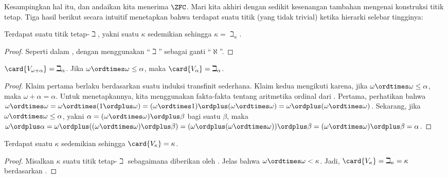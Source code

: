 \documentclass[../../../include/open-logic-section]{subfiles}
\begin{document}
Kesampingkan hal itu, dan andaikan kita menerima $\ZFC$. Mari kita akhiri
dengan sedikit kesenangan tambahan mengenai konstruksi titik tetap. Tiga
hasil berikut secara intuitif menetapkan bahwa terdapat suatu titik (yang
tidak trivial) ketika hierarki selebar tingginya:

\begin{prop}
Terdapat suatu titik tetap-$\beth$, yakni suatu $\kappa$ sedemikian sehingga
$\kappa=\beth_\kappa$.
\end{prop}

\begin{proof}
Seperti dalam , dengan menggunakan ``$\beth$'' sebagai
ganti ``$\aleph$''.
\end{proof}

\begin{prop}
$\card{V_{\omega+\alpha}} = \beth_{\alpha}$. Jika $\omega \ordtimes
\omega \leq \alpha$, maka $\card{V_\alpha} = \beth_\alpha$.
\end{prop}

\begin{proof}
Klaim pertama berlaku berdasarkan suatu induksi transfinit sederhana. Klaim
kedua mengikuti karena, jika $\omega \ordtimes \omega \leq \alpha$, maka
$\omega + \alpha = \alpha$. Untuk menetapkannya, kita menggunakan fakta-fakta
tentang aritmetika ordinal dari . Pertama,
perhatikan bahwa $\omega \ordtimes \omega = \omega \ordtimes (1 \ordplus
\omega) = (\omega \ordtimes 1) \ordplus (\omega\ordtimes\omega) = \omega
\ordplus (\omega \ordtimes \omega)$. Sekarang, jika $\omega \ordtimes \omega
\leq \alpha$, yakni $\alpha = (\omega\ordtimes\omega) \ordplus \beta$ bagi
suatu $\beta$, maka $\omega \ordplus \alpha = \omega \ordplus ((\omega
\ordtimes \omega) \ordplus \beta) = (\omega \ordplus (\omega \ordtimes
\omega)) \ordplus \beta = (\omega \ordtimes \omega) \ordplus \beta =
\alpha$.
\end{proof}

\begin{cor}
Terdapat suatu $\kappa$ sedemikian sehingga $\card{V_\kappa} = \kappa$.
\end{cor}

\begin{proof}
Misalkan $\kappa$ suatu titik tetap-$\beth$ sebagaimana diberikan oleh
. Jelas bahwa $\omega \ordtimes \omega < \kappa$. Jadi,
$\card{V_\kappa} = \beth_\kappa= \kappa$ berdasarkan .
\end{proof}
\end{document}
